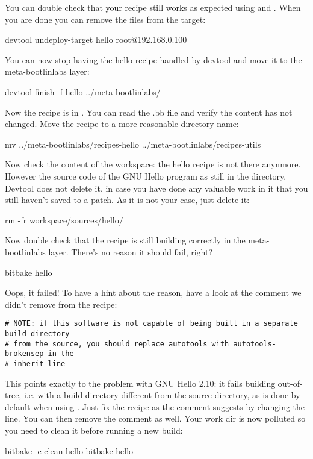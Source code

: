 You can double check that your recipe still works as expected using
 and .
When you are done you can remove the files from the target:
\begin{bashinput}
devtool undeploy-target hello root@192.168.0.100
\end{bashinput}

You can now stop having the hello recipe handled by devtool and move it to
the meta-bootlinlabs layer:
\begin{bashinput}
devtool finish -f hello ../meta-bootlinlabs/
\end{bashinput}

Now the recipe is in
. You can read
the .bb file and verify the content has not changed. Move the recipe to a
more reasonable directory name:
\begin{bashinput}
mv ../meta-bootlinlabs/recipes-hello ../meta-bootlinlabs/recipes-utils
\end{bashinput}

Now check the content of the workspace: the hello recipe is not there
anynmore. However the source code of the GNU Hello program as still in the
 directory. Devtool does not delete it, in
case you have done any valuable work in it that you still haven't saved to
a patch. As it is not your case, just delete it:
\begin{bashinput}
rm -fr workspace/sources/hello/
\end{bashinput}

Now double check that the recipe is still building correctly in the
meta-bootlinlabs layer. There's no reason it should fail, right?
\begin{bashinput}
bitbake hello
\end{bashinput}

Oops, it failed! To have a hint about the reason, have a look at the
comment we didn't remove from the recipe:
\begin{verbatim}
# NOTE: if this software is not capable of being built in a separate build directory
# from the source, you should replace autotools with autotools-brokensep in the
# inherit line
\end{verbatim}

This points exactly to the problem with GNU Hello 2.10: it fails building
out-of-tree, i.e. with a build directory different from the source
directory, as is done by default when using . Just
fix the recipe as the comment suggests by changing the 
line. You can then remove the comment as well. Your work dir is now
polluted so you need to clean it before running a new build:
\begin{bashinput}
bitbake -c clean hello
bitbake hello
\end{bashinput}

